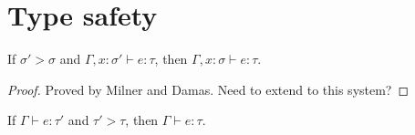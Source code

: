 
\section{Type safety}

\begin{lemma}
  If $\sigma' > \sigma$ and $\Gamma,x : \sigma' \vdash e : \tau$, then $\Gamma, x : \sigma \vdash e : \tau$.
  \label{lem:generalInContext}
\end{lemma}
\begin{proof}
  Proved by Milner and Damas. Need to extend to this system?
\end{proof}

\begin{lemma}
  If $\Gamma \vdash e : \tau'$ and $\tau' > \tau$, then $\Gamma \vdash e : \tau$.
\end{lemma}
